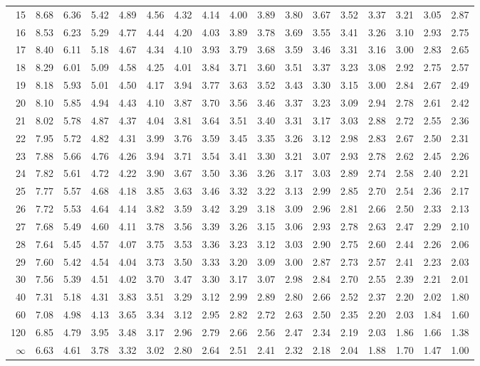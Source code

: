 \begin{center}
\begin{tabular}{r|cccccccccccccccc}
15 & 8.68 & 6.36 & 5.42 & 4.89 & 4.56 & 4.32 & 4.14 & 4.00 & 3.89 & 3.80 & 3.67 & 3.52 & 3.37 & 3.21 & 3.05 & 2.87\\
16 & 8.53 & 6.23 & 5.29 & 4.77 & 4.44 & 4.20 & 4.03 & 3.89 & 3.78 & 3.69 & 3.55 & 3.41 & 3.26 & 3.10 & 2.93 & 2.75\\
17 & 8.40 & 6.11 & 5.18 & 4.67 & 4.34 & 4.10 & 3.93 & 3.79 & 3.68 & 3.59 & 3.46 & 3.31 & 3.16 & 3.00 & 2.83 & 2.65\\
18 & 8.29 & 6.01 & 5.09 & 4.58 & 4.25 & 4.01 & 3.84 & 3.71 & 3.60 & 3.51 & 3.37 & 3.23 & 3.08 & 2.92 & 2.75 & 2.57\\
19 & 8.18 & 5.93 & 5.01 & 4.50 & 4.17 & 3.94 & 3.77 & 3.63 & 3.52 & 3.43 & 3.30 & 3.15 & 3.00 & 2.84 & 2.67 & 2.49\\
20 & 8.10 & 5.85 & 4.94 & 4.43 & 4.10 & 3.87 & 3.70 & 3.56 & 3.46 & 3.37 & 3.23 & 3.09 & 2.94 & 2.78 & 2.61 & 2.42\\
21 & 8.02 & 5.78 & 4.87 & 4.37 & 4.04 & 3.81 & 3.64 & 3.51 & 3.40 & 3.31 & 3.17 & 3.03 & 2.88 & 2.72 & 2.55 & 2.36\\
22 & 7.95 & 5.72 & 4.82 & 4.31 & 3.99 & 3.76 & 3.59 & 3.45 & 3.35 & 3.26 & 3.12 & 2.98 & 2.83 & 2.67 & 2.50 & 2.31\\
23 & 7.88 & 5.66 & 4.76 & 4.26 & 3.94 & 3.71 & 3.54 & 3.41 & 3.30 & 3.21 & 3.07 & 2.93 & 2.78 & 2.62 & 2.45 & 2.26\\
24 & 7.82 & 5.61 & 4.72 & 4.22 & 3.90 & 3.67 & 3.50 & 3.36 & 3.26 & 3.17 & 3.03 & 2.89 & 2.74 & 2.58 & 2.40 & 2.21\\
25 & 7.77 & 5.57 & 4.68 & 4.18 & 3.85 & 3.63 & 3.46 & 3.32 & 3.22 & 3.13 & 2.99 & 2.85 & 2.70 & 2.54 & 2.36 & 2.17\\
26 & 7.72 & 5.53 & 4.64 & 4.14 & 3.82 & 3.59 & 3.42 & 3.29 & 3.18 & 3.09 & 2.96 & 2.81 & 2.66 & 2.50 & 2.33 & 2.13\\
27 & 7.68 & 5.49 & 4.60 & 4.11 & 3.78 & 3.56 & 3.39 & 3.26 & 3.15 & 3.06 & 2.93 & 2.78 & 2.63 & 2.47 & 2.29 & 2.10\\
28 & 7.64 & 5.45 & 4.57 & 4.07 & 3.75 & 3.53 & 3.36 & 3.23 & 3.12 & 3.03 & 2.90 & 2.75 & 2.60 & 2.44 & 2.26 & 2.06\\
29 & 7.60 & 5.42 & 4.54 & 4.04 & 3.73 & 3.50 & 3.33 & 3.20 & 3.09 & 3.00 & 2.87 & 2.73 & 2.57 & 2.41 & 2.23 & 2.03\\
30 & 7.56 & 5.39 & 4.51 & 4.02 & 3.70 & 3.47 & 3.30 & 3.17 & 3.07 & 2.98 & 2.84 & 2.70 & 2.55 & 2.39 & 2.21 & 2.01\\
40 & 7.31 & 5.18 & 4.31 & 3.83 & 3.51 & 3.29 & 3.12 & 2.99 & 2.89 & 2.80 & 2.66 & 2.52 & 2.37 & 2.20 & 2.02 & 1.80\\
60 & 7.08 & 4.98 & 4.13 & 3.65 & 3.34 & 3.12 & 2.95 & 2.82 & 2.72 & 2.63 & 2.50 & 2.35 & 2.20 & 2.03 & 1.84 & 1.60\\
120 & 6.85 & 4.79 & 3.95 & 3.48 & 3.17 & 2.96 & 2.79 & 2.66 & 2.56 & 2.47 & 2.34 & 2.19 & 2.03 & 1.86 & 1.66 & 1.38\\
$\infty$ & 6.63 & 4.61 & 3.78 & 3.32 & 3.02 & 2.80 & 2.64 & 2.51 & 2.41 & 2.32 & 2.18 & 2.04 & 1.88 & 1.70 & 1.47 & 1.00\\\bottomrule
\end{tabular}\end{center}
